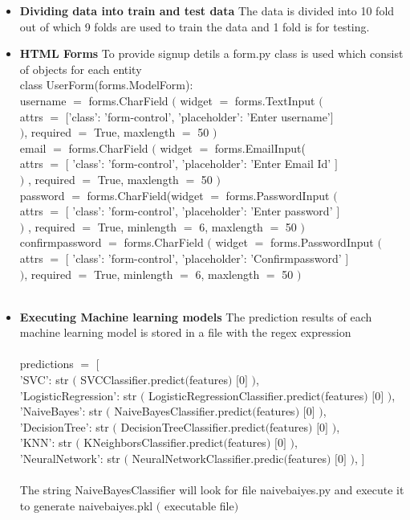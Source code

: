 \documentclass[oneside,12pt]{Classes/VTU}
\begin{document}
	\begin{itemize}
		\item \textbf{Dividing data into train and test data} The data is divided into 10 fold out of which 9 folds are used to train the data and 1 fold is for testing.
		\item \textbf{HTML Forms} To provide signup detils a form.py class is used which consist of objects for each entity\\
class UserForm(forms.ModelForm): \\
	username $=$ forms.CharField $($ widget $=$ forms.TextInput $($ \\
	attrs $=$ $[$'class': 'form-control', 'placeholder': 'Enter username'$]$ \\
	$)$, required $=$ True, maxlength $=$ 50 $)$ \\
	
	email $=$ forms.CharField $($ widget $=$ forms.EmailInput(  \\
attrs $=$ $[$ 'class': 'form-control', 'placeholder': 'Enter Email Id' $]$  \\
 $)$ , required $=$ True, maxlength $=$ 50 $)$  \\

password $=$ forms.CharField(widget $=$ forms.PasswordInput $($  \\
attrs $=$ $[$ 'class': 'form-control', 'placeholder': 'Enter password' $]$  \\
 $)$ , required $=$ True, minlength $=$ 6, maxlength $=$ 50 $)$  \\

confirmpassword $=$ forms.CharField $($ widget $=$ forms.PasswordInput $($  \\
attrs $=$ $[$ 'class': 'form-control', 'placeholder': 'Confirmpassword' $]$  \\
 $)$, required $=$ True, minlength $=$ 6, maxlength $=$ 50 $)$  \\
 \\
 	\item \textbf{Executing Machine learning models} The prediction results of each machine learning model is stored in a file with the regex expression\\
 	\\
	predictions $=$ $[$ \\
'SVC': str $($ SVCClassifier.predict$($features$)$ $[$0$]$ $)$, \\
'LogisticRegression': str $($ LogisticRegressionClassifier.predict$($features$)$ $[$0$]$ $)$, \\
'NaiveBayes': str $($ NaiveBayesClassifier.predict$($features$)$ $[$0$]$ $)$, \\
'DecisionTree': str $($ DecisionTreeClassifier.predict$($features$)$ $[$0$]$ $)$, \\
'KNN': str $($ KNeighborsClassifier.predict$($features$)$ $[$0$]$ $)$, \\
 'NeuralNetwork': str $($ NeuralNetworkClassifier.predic$($features$)$ $[$0$]$ $)$, $]$ \\
\\
The string NaiveBayesClassifier will look for file naivebaiyes.py and execute it to generate naivebaiyes.pkl $($ executable file$)$


\end{itemize}
\end{document}
